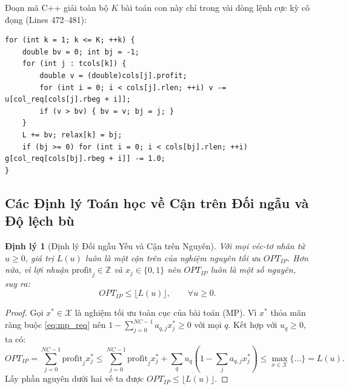\documentclass[11pt,a4paper]{article}
\newtheorem{theorem}{Định lý}[section]
\theoremstyle{definition}
\begin{document}
Đoạn mã C++ giải toàn bộ $K$ bài toán con này chỉ trong vài dòng lệnh cực kỳ cô đọng (Lines 472--481):
\begin{lstlisting}
for (int k = 1; k <= K; ++k) {
    double bv = 0; int bj = -1;
    for (int j : tcols[k]) {
        double v = (double)cols[j].profit;
        for (int i = 0; i < cols[j].rlen; ++i) v -= u[col_req[cols[j].rbeg + i]];
        if (v > bv) { bv = v; bj = j; }
    }
    L += bv; relax[k] = bj;
    if (bj >= 0) for (int i = 0; i < cols[bj].rlen; ++i) g[col_req[cols[bj].rbeg + i]] -= 1.0;
}
\end{lstlisting}

\subsection{Các Định lý Toán học về Cận trên Đối ngẫu và Độ lệch bù}

\begin{theorem}[Định lý Đối ngẫu Yếu và Cận trên Nguyên]
Với mọi véc-tơ nhân tử $u \ge 0$, giá trị $L(u)$ luôn là một cận trên của nghiệm nguyên tối ưu $OPT_{IP}$. Hơn nữa, vì lợi nhuận $\text{profit}_j \in \mathbb{Z}$ và $x_j \in \{0, 1\}$ nên $OPT_{IP}$ luôn là một số nguyên, suy ra:
\begin{equation}
    OPT_{IP} \le \lfloor L(u) \rfloor, \qquad \forall u \ge 0.
\end{equation}
\end{theorem}
\begin{proof}
Gọi $x^* \in \mathcal{X}$ là nghiệm tối ưu toàn cục của bài toán (MP). Vì $x^*$ thỏa mãn ràng buộc \eqref{eq:mp_req} nên $1 - \sum_{j=0}^{NC-1} a_{q, j} x^*_j \ge 0$ với mọi $q$. Kết hợp với $u_q \ge 0$, ta có:
\[
    OPT_{IP} = \sum_{j=0}^{NC-1} \text{profit}_j x^*_j \le \sum_{j=0}^{NC-1} \text{profit}_j x^*_j + \sum_{q} u_q \left(1 - \sum_{j} a_{q, j} x^*_j\right) \le \max_{x \in \mathcal{X}} \{\dots\} = L(u).
\]
Lấy phần nguyên dưới hai vế ta được $OPT_{IP} \le \lfloor L(u) \rfloor$.
\end{proof}
\end{document}

